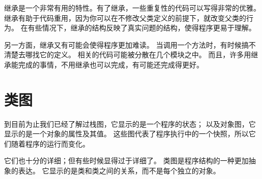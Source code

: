 
继承是一个非常有用的特性。有了继承，一些重复性的代码可以写得非常的优雅。
继承有助于代码重用，因为你可以在不修改父类定义的前提下，就改变父类的行为。
在有些情况下，继承的结构反映了真实问题的结构，使得程序更易于理解。


另一方面，继承又有可能会使得程序更加难读。
当调用一个方法时，有时候搞不清楚去哪找它的定义。
相关的代码可能被分散在几个模块之中。
而且，许多用继承能完成的事情，不用继承也可以完成，有可能还完成得更好。

\section{类图}
\label{class.diagram}


到目前为止我们已经了解过栈图，它显示的是一个程序的状态；  
以及对象图，它显示的是一个对象的属性及其值。  
这些图代表了程序执行中的一个快照，所以它们随着程序的运行而变化。


它们也十分的详细；但有些时候显得过于详细了。  
类图是程序结构的一种更加抽象的表达。  
它显示的是类和类之间的关系，而不是每个独立的对象。  


